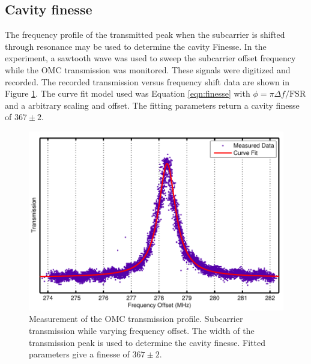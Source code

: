 \subsection{Cavity finesse}
The frequency profile of the transmitted peak when the subcarrier is shifted through resonance may be used to determine the cavity Finesse. %
In the experiment, a sawtooth wave was used to sweep the subcarrier offset frequency while the OMC transmission was monitored. %
These signals were digitized and recorded. %
The recorded transmission versus frequency shift data are shown in Figure \ref{fig:FSRfit}. %
The curve fit model used was Equation \ref{eqn:finesse} with $\phi=\pi \Delta f/\mathrm{FSR}$ and a arbitrary scaling and offset. %
The fitting parameters return a cavity finesse of $367\pm2$.
\begin{figure}
  \begin{center}
  \leavevmode
  \includegraphics{figs-omc/FSRfit.pdf}
  \end{center}
  \caption[Measurement of the OMC transmission profile.]{Measurement of the OMC transmission profile. Subcarrier transmission while varying frequency offset. The width of the transmission peak is used to determine the cavity finesse. Fitted parameters give a finesse of $367\pm2$.}
  \label{fig:FSRfit}
\end{figure}

